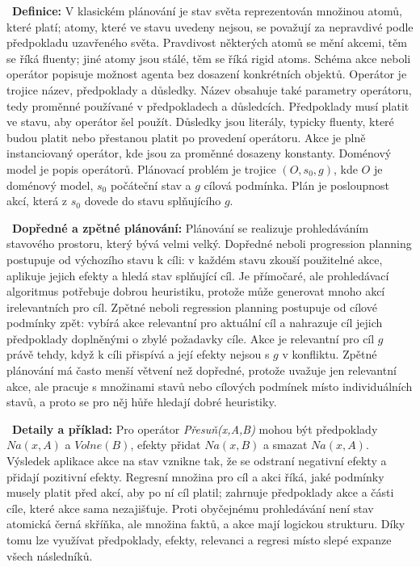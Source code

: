 \begin{odpoved}
\setlength{\parskip}{2pt}
\noindent{}\ \textbf{Definice:} V klasickém plánování je stav světa reprezentován množinou atomů, které platí; atomy, které ve stavu uvedeny nejsou, se považují za nepravdivé podle předpokladu uzavřeného světa. Pravdivost některých atomů se mění akcemi, těm se říká fluenty; jiné atomy jsou stálé, těm se říká rigid atoms. Schéma akce neboli operátor popisuje možnost agenta bez dosazení konkrétních objektů. Operátor je trojice název, předpoklady a důsledky. Název obsahuje také parametry operátoru, tedy proměnné používané v předpokladech a důsledcích. Předpoklady musí platit ve stavu, aby operátor šel použít. Důsledky jsou literály, typicky fluenty, které budou platit nebo přestanou platit po provedení operátoru. Akce je plně instanciovaný operátor, kde jsou za proměnné dosazeny konstanty. Doménový model je popis operátorů. Plánovací problém je trojice $(O,s_0,g)$, kde $O$ je doménový model, $s_0$ počáteční stav a $g$ cílová podmínka. Plán je posloupnost akcí, která z $s_0$ dovede do stavu splňujícího $g$.\par
\noindent{}\ \textbf{Dopředné a zpětné plánování:} Plánování se realizuje prohledáváním stavového prostoru, který bývá velmi velký. Dopředné neboli progression planning postupuje od výchozího stavu k cíli: v každém stavu zkouší použitelné akce, aplikuje jejich efekty a hledá stav splňující cíl. Je přímočaré, ale prohledávací algoritmus potřebuje dobrou heuristiku, protože může generovat mnoho akcí irelevantních pro cíl. Zpětné neboli regression planning postupuje od cílové podmínky zpět: vybírá akce relevantní pro aktuální cíl a nahrazuje cíl jejich předpoklady doplněnými o zbylé požadavky cíle. Akce je relevantní pro cíl $g$ právě tehdy, když k cíli přispívá a její efekty nejsou s $g$ v konfliktu. Zpětné plánování má často menší větvení než dopředné, protože uvažuje jen relevantní akce, ale pracuje s množinami stavů nebo cílových podmínek místo individuálních stavů, a proto se pro něj hůře hledají dobré heuristiky.\par
\noindent{}\ \textbf{Detaily a příklad:} Pro operátor \emph{Přesuň(x,A,B)} mohou být předpoklady $Na(x,A)$ a $Volne(B)$, efekty přidat $Na(x,B)$ a smazat $Na(x,A)$. Výsledek aplikace akce na stav vznikne tak, že se odstraní negativní efekty a přidají pozitivní efekty. Regresní množina pro cíl a akci říká, jaké podmínky musely platit před akcí, aby po ní cíl platil; zahrnuje předpoklady akce a části cíle, které akce sama nezajišťuje. Proti obyčejnému prohledávání není stav atomická černá skříňka, ale množina faktů, a akce mají logickou strukturu. Díky tomu lze využívat předpoklady, efekty, relevanci a regresi místo slepé expanze všech následníků.
\end{odpoved}

